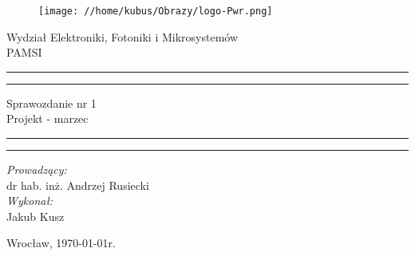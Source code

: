 \begin{titlepage}
\begin{figure}
	\centering
	\texttt{[image: //home/kubus/Obrazy/logo-Pwr.png]}
	
	\label{fig:pwr}
\end{figure}
	\begin{center}
		\huge Wydział Elektroniki, Fotoniki i Mikrosystemów \\ 
		\vspace{40pt}
		\huge PAMSI  \\
	\end{center}
	\vspace{60pt}
	\hrule
	\vspace{1pt}
	\hrule
	\begin{center}
		{\fontsize{40}{50}\selectfont Sprawozdanie nr 1\\ }
		\vspace{10pt}
		{\fontsize{25}{25}\selectfont Projekt - marzec  }
	\end{center}
	\hrule
	\vspace{1pt}
	\hrule
	\begin{flushright}
		\vspace{65pt}
		\textit{\Large Prowadzący:}\\
		
		\Large dr hab. inż. Andrzej Rusiecki\\
		\vspace{10pt}
		\textit{\Large Wykonał:}\\
		
		\Large Jakub Kusz \\
	
	\end{flushright}
	\vspace{100pt}
	\begin{center}
		\large Wrocław, \today r.
	\end{center}
\end{titlepage}

